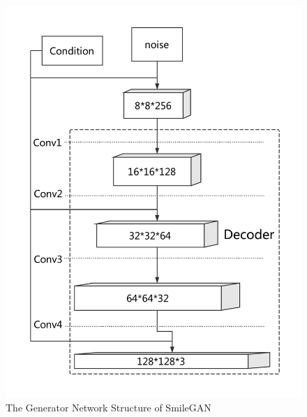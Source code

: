 \begin{figure}
    \begin{minipage}[t]{0.48\linewidth}
        \centering
        \includegraphics[width=\textwidth]{figures/net_generator.pdf}
        \caption{The Generator Network Structure of SmileGAN}
        \label{net_generator}
    \end{minipage}
        \hfill
    \begin{minipage}[t]{0.48\linewidth}
        \centering

\end{minipage}
\end{figure}
